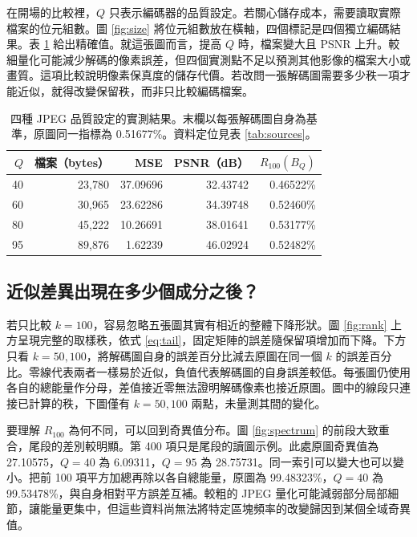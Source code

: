 \documentclass[12pt,a4paper,onecolumn]{article}
\begin{document}
在開場的比較裡，$Q$ 只表示編碼器的品質設定。若關心儲存成本，需要讀取實際檔案的位元組數。圖 \ref{fig:size} 將位元組數放在橫軸，四個標記是四個獨立編碼結果。表 \ref{tab:results} 給出精確值。就這張圖而言，提高 $Q$ 時，檔案變大且 PSNR 上升。較細量化可能減少解碼的像素誤差，但四個實測點不足以預測其他影像的檔案大小或畫質。這項比較說明像素保真度的儲存代價。若改問一張解碼圖需要多少秩一項才能近似，就得改變保留秩，而非只比較編碼檔案。


\begin{table}[!htb]
\centering
\caption{四種 JPEG 品質設定的實測結果。末欄以每張解碼圖自身為基準，原圖同一指標為 0.51677\%。資料定位見表 \ref{tab:sources}。}
\label{tab:results}
\begin{tabular}{rrrrr}
\toprule
$Q$ & 檔案（bytes） & MSE & PSNR（dB） & $R_{100}(B_Q)$\\
\midrule
40 & 23,780 & 37.09696 & 32.43742 & 0.46522\%\\
60 & 30,965 & 23.62286 & 34.39748 & 0.52460\%\\
80 & 45,222 & 10.26691 & 38.01641 & 0.53177\%\\
95 & 89,876 & 1.62239 & 46.02924 & 0.52482\%\\
\bottomrule
\end{tabular}
\end{table}

\subsection{近似差異出現在多少個成分之後？}
若只比較 $k=100$，容易忽略五張圖其實有相近的整體下降形狀。圖 \ref{fig:rank} 上方呈現完整的取樣秩，依式 \eqref{eq:tail}，固定矩陣的誤差隨保留項增加而下降。下方只看 $k=50,100$，將解碼圖自身的誤差百分比減去原圖在同一個 $k$ 的誤差百分比。零線代表兩者一樣易於近似，負值代表解碼圖的自身誤差較低。每張圖仍使用各自的總能量作分母，差值接近零無法證明解碼像素也接近原圖。圖中的線段只連接已計算的秩，下圖僅有 $k=50,100$ 兩點，未量測其間的變化。

要理解 $R_{100}$ 為何不同，可以回到奇異值分布。圖 \ref{fig:spectrum} 的前段大致重合，尾段的差別較明顯。第 400 項只是尾段的讀圖示例。此處原圖奇異值為 27.10575，$Q=40$ 為 6.09311，$Q=95$ 為 28.75731。同一索引可以變大也可以變小。把前 100 項平方加總再除以各自總能量，原圖為 99.48323\%，$Q=40$ 為 99.53478\%，與自身相對平方誤差互補。較粗的 JPEG 量化可能減弱部分局部細節，讓能量更集中，但這些資料尚無法將特定區塊頻率的改變歸因到某個全域奇異值。
\end{document}
